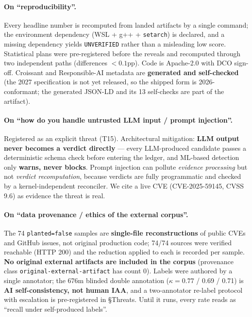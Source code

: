 \documentclass[11pt]{article}
\begin{document}
\paragraph{On ``reproducibility''.}
Every headline number is recomputed from landed artifacts by a single command; the environment
dependency (WSL + g++ + \texttt{setarch}) is declared, and a missing dependency yields
\texttt{UNVERIFIED} rather than a misleading low score. Statistical plans were pre-registered before
the reveals and recomputed through two independent paths (differences $<0.1$pp). Code is Apache-2.0
with DCO sign-off. Croissant and Responsible-AI metadata are \textbf{generated and self-checked}
(the 2027 specification is not yet released, so the shipped form is 2026-conformant; the generated
JSON-LD and its 13 self-checks are part of the artifact).

\paragraph{On ``how do you handle untrusted LLM input / prompt injection''.}
Registered as an explicit threat (T15). Architectural mitigation: \textbf{LLM output never becomes a
verdict directly} --- every LLM-produced candidate passes a deterministic schema check before
entering the ledger, and ML-based detection only \textbf{warns, never blocks}. Prompt injection can
pollute \emph{evidence processing} but not \emph{verdict recomputation}, because verdicts are fully
programmatic and checked by a kernel-independent reconciler. We cite a live CVE (CVE-2025-59145,
CVSS 9.6) as evidence the threat is real.

\paragraph{On ``data provenance / ethics of the external corpus''.}
The 74 \texttt{planted=false} samples are \textbf{single-file reconstructions} of public CVEs and
GitHub issues, not original production code; 74/74 sources were verified reachable (HTTP 200) and
the reduction applied to each is recorded per sample. \textbf{No original external artifacts are
included in the corpus} (provenance class \texttt{original-external-artifact} has count 0). Labels
were authored by a single annotator; the 676m blinded double annotation ($\kappa{=}0.77$ / 0.69 /
0.71) is \textbf{AI self-consistency, not human IAA}, and a two-annotator re-label protocol with
escalation is pre-registered in \S Threats. Until it runs, every rate reads as ``recall under
self-produced labels''.
\end{document}
